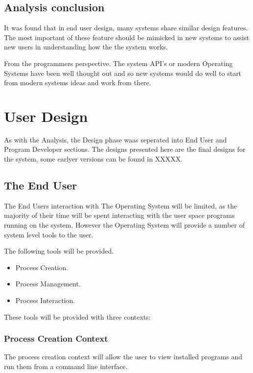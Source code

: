 \documentclass[a4paper]{report}
\begin{document}
\section{Analysis conclusion}

It was found that in end user design, many systems share similar design features. The most important of these feature should be mimicked in new systems to assist new users in understanding how the the system works.

From the programmers perspective. The system API's or modern Operating Systems have been well thought out and so new systems would do well to start from modern systems ideas and work from there.


\clearpage
\chapter{User Design}

As with the Analysis, the Design phase waas seperated into End User and Program Developer sections. The designs presented here are the final designs for the system, some earlyer versions can be found in XXXXX.

\section{The End User}

The End Users interaction with The Operating System will be limited, as the majority of their time will be spent interacting with the user space programs running on the system. However the Operating System will provide a number of system level tools to the user.

The following tools will be provided.
\begin{itemize}
\item Process Creation.
\item Process Management.
\item Process Interaction.
\end{itemize}

These tools will be provided with three contexts:

\subsection{Process Creation Context}

The process creation context will allow the user to view installed programs and run them from a command line interface.
\end{document}
